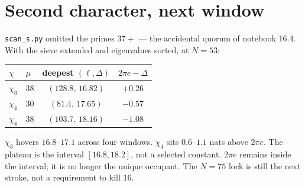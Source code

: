\documentclass[10pt]{article}
\begin{document}
\section{Second character, next window}

\texttt{scan\_s.py} omitted the primes $37+$ --- the accidental
quorum of notebook 16.4. With the sieve extended and eigenvalues
sorted, at $N=53$:

\begin{center}\small
\begin{tabular}{llcc}
\toprule
$\chi$ & $\mu$ & deepest $(\ell,\Delta)$ & $2\pi e-\Delta$ \\
\midrule
$\chi_3$ & 38 & $(128.8,\,16.82)$ & $+0.26$ \\
$\chi_4$ & 30 & $(81.4,\,17.65)$ & $-0.57$ \\
$\chi_4$ & 38 & $(103.7,\,18.16)$ & $-1.08$ \\
\bottomrule
\end{tabular}
\end{center}
$\chi_3$ hovers $16.8$--$17.1$ across four windows. $\chi_4$ sits
$0.6$--$1.1$ nats above $2\pi e$. The plateau is the interval
$[16.8,18.2]$, not a selected constant. $2\pi e$ remains inside
the interval; it is no longer the unique occupant. The $N=75$
lock is still the next stroke, not a requirement to kill $16$.
\end{document}
